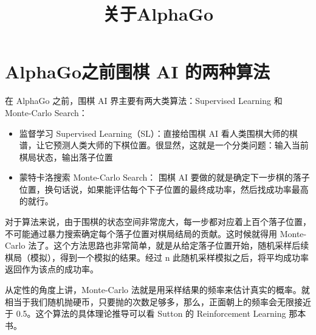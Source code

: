 \documentclass[12pt]{article}
\title{关于AlphaGo\cite{Talk_About_AlphaGo}}
\begin{document}
\maketitle

\section{AlphaGo之前围棋 AI 的两种算法}
在 AlphaGo 之前，围棋 AI 界主要有两大类算法：Supervised Learning 和 Monte-Carlo Search：

\begin{itemize}[itemindent=2em]
    \item 监督学习 Supervised Learning（SL）：直接给围棋 AI 看人类围棋大师的棋谱，让它预测人类大师的下棋位置。很显然，这就是一个分类问题：输入当前棋局状态，输出落子位置
    \item 蒙特卡洛搜索 Monte-Carlo Search：
    围棋 AI 要做的就是确定下一步棋的落子位置，换句话说，如果能评估每个下子位置的最终成功率，然后找成功率最高的就行。
\end{itemize}

对于算法来说，由于围棋的状态空间非常庞大，每一步都对应着上百个落子位置，不可能通过暴力搜索确定每个落子位置对棋局结局的贡献。这时候就得用 Monte-Carlo 法了。这个方法思路也非常简单，就是从给定落子位置开始，随机采样后续棋局（模拟），得到一个模拟的结果。经过 n 此随机采样模拟之后，将平均成功率返回作为该点的成功率。

从定性的角度上讲，Monte-Carlo 法就是用采样结果的频率来估计真实的概率。就相当于我们随机抛硬币，只要抛的次数足够多，那么，正面朝上的频率会无限接近于 0.5。这个算法的具体理论推导可以看 Sutton 的 Reinforcement Learning 那本书。
\end{document}

